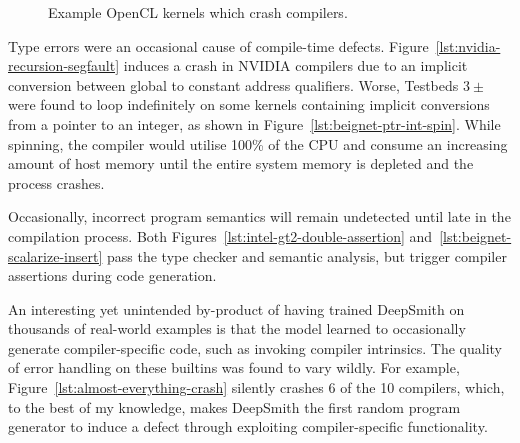 \begin{figure}
  \centering %
  \\%
  \\%
  \\%
  \\%
  \\%
  \caption[Example OpenCL kernels which crash compilers]{%
    Example OpenCL kernels which crash compilers.%
  }%
\end{figure}

Type errors were an occasional cause of compile-time defects. Figure~\ref{lst:nvidia-recursion-segfault} induces a crash in NVIDIA compilers due to an implicit conversion between global to constant address qualifiers. Worse, Testbeds $3\pm$ were found to loop indefinitely on some kernels containing implicit conversions from a pointer to an integer, as shown in Figure~\ref{lst:beignet-ptr-int-spin}. While spinning, the compiler would utilise 100\% of the CPU and consume an increasing amount of host memory until the entire system memory is depleted and the process crashes.

Occasionally, incorrect program semantics will remain undetected until late in the compilation process. Both Figures~\ref{lst:intel-gt2-double-assertion} and~\ref{lst:beignet-scalarize-insert} pass the type checker and semantic analysis, but trigger compiler assertions during code generation.

An interesting yet unintended by-product of having trained DeepSmith on thousands of real-world examples is that the model learned to occasionally generate compiler-specific code, such as invoking compiler intrinsics. The quality of error handling on these builtins was found to vary wildly. For example, Figure~\ref{lst:almost-everything-crash} silently crashes 6 of the 10 compilers, which, to the best of my knowledge, makes DeepSmith the first random program generator to induce a defect through exploiting compiler-specific functionality.

